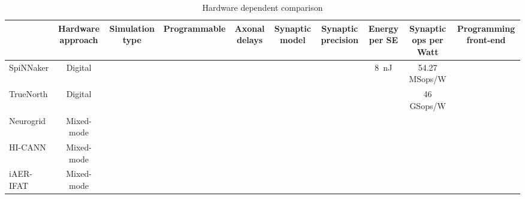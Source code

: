 \begin{table*}
  \caption{Hardware dependent comparison}
  \begin{center}
      \bgroup
      \def\arraystretch{1.4}
    \begin{tabular}{l | c c c c c c c c c}
      $ $ & 
       \begin{minipage}{1.2cm}\centering Hardware approach \end{minipage} & 
       \begin{minipage}{1.3cm}\centering Simulation type \end{minipage} & 
       \begin{minipage}{1.7cm}\centering Programmable \end{minipage} & 
       \begin{minipage}{1cm}\centering Axonal delays \end{minipage} & 
       \begin{minipage}{1cm}\centering Synaptic model \end{minipage} & 
       \begin{minipage}{1.2cm}\centering Synaptic precision \end{minipage} & 
       \begin{minipage}{1.2cm}\centering Energy per SE \end{minipage} & 
       \begin{minipage}{1.4cm}\centering Synaptic ops per Watt \end{minipage} & 
       \begin{minipage}{1.7cm}\centering Programming front-end \end{minipage}  \\
       \hline
       \begin{minipage}{1.8cm}\centering \vspace*{0.1cm} SpiNNaker \citep{strometal} \end{minipage} &Digital& & & & & & 8~nJ &54.27 MSops/W & \\
       \begin{minipage}{1.8cm}\centering \vspace*{0.1cm} TrueNorth \citep{Merolla08082014}\end{minipage} &Digital& & & & & & &46 GSops/W & \\
       \begin{minipage}{1.8cm}\centering \vspace*{0.1cm} Neurogrid \citep{Benjamin_etal14}\end{minipage} &Mixed-mode& & & & & & & & \\
       \begin{minipage}{1.8cm}\centering \vspace*{0.1cm} HI-CANN \citep{Schemmel_etal10}  \end{minipage} &Mixed-mode & & & & & & & & \\
       \begin{minipage}{1.8cm}\centering \vspace*{0.1cm} iAER-IFAT \citep{gert}\end{minipage} &Mixed-mode & & & & & & & & 
       

\end{tabular}
\end{center}
\end{table*}
